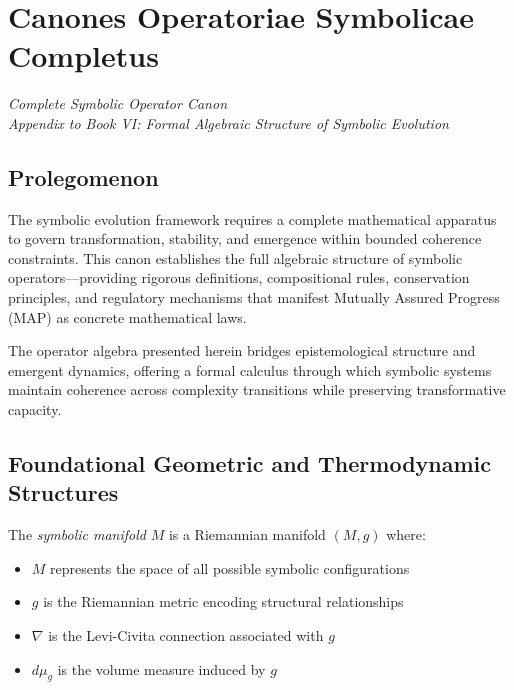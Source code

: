 \section{Canones Operatoriae Symbolicae Completus}
\label{sec:bk6_canones_operatoriae_symbolicae_completus}
\begin{center}
\textit{Complete Symbolic Operator Canon}\\
\textit{Appendix to Book VI: Formal Algebraic Structure of Symbolic Evolution}
\end{center}

\subsection*{Prolegomenon}
\label{subsection:bk6_prolegomenon_completus}
The symbolic evolution framework requires a complete mathematical apparatus to govern transformation, stability, and emergence within bounded coherence constraints. This canon establishes the full algebraic structure of symbolic operators—providing rigorous definitions, compositional rules, conservation principles, and regulatory mechanisms that manifest Mutually Assured Progress (MAP) as concrete mathematical laws.

The operator algebra presented herein bridges epistemological structure and emergent dynamics, offering a formal calculus through which symbolic systems maintain coherence across complexity transitions while preserving transformative capacity.

\subsection{Foundational Geometric and Thermodynamic Structures}
\label{subsection:bk6_foundational_geometric_thermodynamic_structures}

\begin{definition}
\label{definition:bk6_symbolic_manifold_structure}
The \emph{symbolic manifold} $M$ is a Riemannian manifold $(M, g)$ where:
\begin{itemize}
\item $M$ represents the space of all possible symbolic configurations
\item $g$ is the Riemannian metric encoding structural relationships
\item $\nabla$ is the Levi-Civita connection associated with $g$
\item $d\mu_g$ is the volume measure induced by $g$
\end{itemize}
\end{definition}

